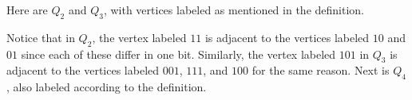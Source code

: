 \newpage
\begin{exa}
Here are $Q_2$ and $Q_3$, with vertices labeled as mentioned in the definition.
\begin{center}
\hspace*{1in}
\end{center}

Notice that in $Q_2$, the vertex labeled $11$ is adjacent to the vertices
labeled $10$ and $01$ since each of these differ in one bit.
Similarly, the vertex labeled $101$ in $Q_3$ is adjacent to the vertices
labeled $001$, $111$, and $100$ for the same reason. Next is $Q_4$, 
also labeled according to the definition.

\begin{center}
\end{center}

%

\end{exa}


